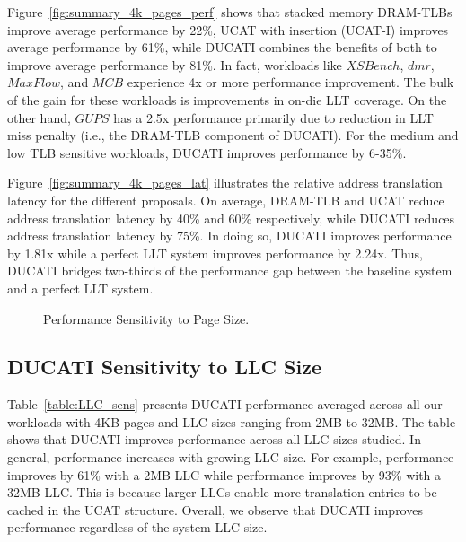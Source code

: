 Figure~\ref{fig:summary_4k_pages_perf} shows that stacked memory
DRAM-TLBs improve average performance by 22\%, UCAT with insertion
(UCAT-I) improves average performance by 61\%, while DUCATI combines
the benefits of both to improve average performance by 81\%. In fact,
workloads like $XSBench$, $dmr$, $MaxFlow$, and $MCB$ experience 4x or
more performance improvement. The bulk of the gain for these workloads
is improvements in on-die LLT coverage. On the other hand, $GUPS$ has
a 2.5x performance primarily due to reduction in LLT miss penalty
(i.e., the DRAM-TLB component of DUCATI). For the medium and low TLB
sensitive workloads, DUCATI improves performance by 6-35\%.

Figure~\ref{fig:summary_4k_pages_lat} illustrates the relative address
translation latency for the different proposals. On average, DRAM-TLB
and UCAT reduce address translation latency by 40\% and 60\%
respectively, while DUCATI reduces address translation latency by
75\%. In doing so, DUCATI improves performance by 1.81x while a
perfect LLT system improves performance by 2.24x. Thus, DUCATI bridges
two-thirds of the performance gap between the baseline system and a
perfect LLT system.

\begin{figure}[b] 
\vspace{0.2 in} \centering
\centerline{}

\caption{\small Performance Sensitivity to Page Size. \normalsize}

\label{fig:summary_pagesize} 
\vspace{-0. in}
\end{figure}



\subsection{DUCATI Sensitivity to LLC Size}

\noindent Table~\ref{table:LLC_sens} presents DUCATI performance
averaged across all our workloads with 4KB pages and LLC sizes ranging
from 2MB to 32MB. The table shows that DUCATI improves performance
across all LLC sizes studied. In general, performance increases with
growing LLC size. For example, performance improves by 61\% with a 2MB
LLC while performance improves by 93\% with a 32MB LLC. This is
because larger LLCs enable more translation entries to be cached in
the UCAT structure. Overall, we observe that DUCATI improves
performance regardless of the system LLC size.

